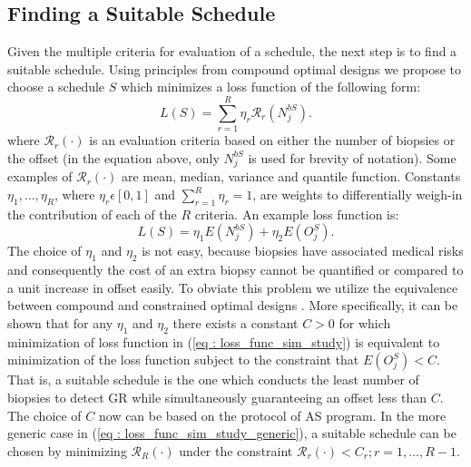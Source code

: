 \subsection{Finding a Suitable Schedule}
Given the multiple criteria for evaluation of a schedule, the next step is to find a suitable schedule. Using principles from compound optimal designs \citep{lauter1976optimal} we propose to choose a schedule $S$ which minimizes a loss function of the following form:
\begin{equation}
\label{eq : loss_func_sim_study_generic}
L(S) = \sum_{r=1}^R \eta_r \mathcal{R}_r(N^{bS}_j).
\end{equation}
where $\mathcal{R}_r(\cdot)$ is an evaluation criteria based on either the number of biopsies or the offset (in the equation above, only $N^{bS}_j$ is used for brevity of notation). Some examples of $\mathcal{R}_r(\cdot)$ are mean, median, variance and quantile function. Constants $\eta_1, \ldots, \eta_R$, where $\eta_r \epsilon [0,1]$ and $\sum_{r=1}^R \eta_r = 1$, are weights to differentially weigh-in the contribution of each of the $R$ criteria. An example loss function is:
\begin{equation}
\label{eq : loss_func_sim_study}
L(S) = \eta_1 E(N^{bS}_j) + \eta_2 E(O^S_j). 
\end{equation}
The choice of $\eta_1$ and $\eta_2$ is not easy, because biopsies have associated medical risks and consequently the cost of an extra biopsy cannot be quantified or compared to a unit increase in offset easily. To obviate this problem we utilize the equivalence between compound and constrained optimal designs \citep{cook1994equivalence}. More specifically, it can be shown that for any $\eta_1$ and $\eta_2$ there exists a constant $C>0$ for which minimization of loss function in (\ref{eq : loss_func_sim_study}) is equivalent to minimization of the loss function subject to the constraint that $E(O^S_j) < C$. That is, a suitable schedule is the one which conducts the least number of biopsies to detect GR while simultaneously guaranteeing an offset less than $C$. The choice of $C$ now can be based on the protocol of AS program. In the more generic case in (\ref{eq : loss_func_sim_study_generic}), a suitable schedule can be chosen by minimizing $\mathcal{R}_R(\cdot)$ under the constraint $\mathcal{R}_r(\cdot) < C_r; r=1, \ldots, R-1$.